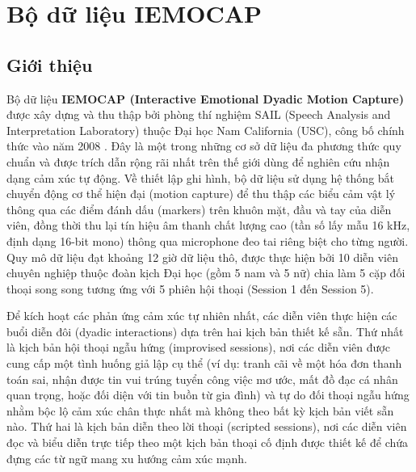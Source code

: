 \section{Bộ dữ liệu IEMOCAP}
\label{sec:iemocap_dataset}

\subsection{Giới thiệu}

Bộ dữ liệu \textbf{IEMOCAP (Interactive Emotional Dyadic Motion Capture)} được xây dựng và thu thập bởi phòng thí nghiệm SAIL (Speech Analysis and Interpretation Laboratory) thuộc Đại học Nam California (USC), công bố chính thức vào năm 2008 \cite{busso2008}. Đây là một trong những cơ sở dữ liệu đa phương thức quy chuẩn và được trích dẫn rộng rãi nhất trên thế giới dùng để nghiên cứu nhận dạng cảm xúc tự động. Về thiết lập ghi hình, bộ dữ liệu sử dụng hệ thống bắt chuyển động cơ thể hiện đại (motion capture) để thu thập các biểu cảm vật lý thông qua các điểm đánh dấu (markers) trên khuôn mặt, đầu và tay của diễn viên, đồng thời thu lại tín hiệu âm thanh chất lượng cao (tần số lấy mẫu 16 kHz, định dạng 16-bit mono) thông qua microphone đeo tai riêng biệt cho từng người. Quy mô dữ liệu đạt khoảng 12 giờ dữ liệu thô, được thực hiện bởi 10 diễn viên chuyên nghiệp thuộc đoàn kịch Đại học (gồm 5 nam và 5 nữ) chia làm 5 cặp đối thoại song song tương ứng với 5 phiên hội thoại (Session 1 đến Session 5).

Để kích hoạt các phản ứng cảm xúc tự nhiên nhất, các diễn viên thực hiện các buổi diễn đôi (dyadic interactions) dựa trên hai kịch bản thiết kế sẵn. Thứ nhất là kịch bản hội thoại ngẫu hứng (improvised sessions), nơi các diễn viên được cung cấp một tình huống giả lập cụ thể (ví dụ: tranh cãi về một hóa đơn thanh toán sai, nhận được tin vui trúng tuyển công việc mơ ước, mất đồ đạc cá nhân quan trọng, hoặc đối diện với tin buồn từ gia đình) và tự do đối thoại ngẫu hứng nhằm bộc lộ cảm xúc chân thực nhất mà không theo bất kỳ kịch bản viết sẵn nào. Thứ hai là kịch bản diễn theo lời thoại (scripted sessions), nơi các diễn viên đọc và biểu diễn trực tiếp theo một kịch bản thoại cố định được thiết kế để chứa đựng các từ ngữ mang xu hướng cảm xúc mạnh.

